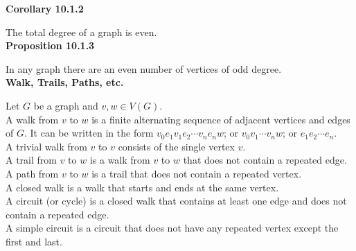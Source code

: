 \documentclass[a4paper]{article}
\newcommand{\subheading}[1]{{\scriptsize\textbf{#1}}}
\begin{document}
\begin{multicols*}{4}
\subheading{Corollary 10.1.2}

The total degree of a graph is even.\\

\subheading{Proposition 10.1.3}

In any graph there are an even number of vertices of odd degree.\\

\subheading{Walk, Trails, Paths, etc.}

Let $G$ be a graph and $v, w \in V(G)$.\\

A walk from $v$ to $w$ is a finite alternating sequence of adjacent vertices and
edges of $G$. It can be written in the form $v_0e_1v_1e_2\cdots v_ne_nw$; or
$v_0v_1\cdots v_nw$; or $e_1e_2\cdots e_n$.\\

A trivial walk from $v$ to $v$ consists of the single vertex $v$.\\

A trail from $v$ to $w$ is a walk from $v$ to $w$ that does not contain a
repeated edge.\\

A path from $v$ to $w$ is a trail that does not contain a repeated vertex.\\

A closed walk is a walk that starts and ends at the same vertex.\\

A circuit (or cycle) is a closed walk that contains at least one edge and does
not contain a repeated edge.\\

A simple circuit is a circuit that does not have any repeated vertex except the
first and last.

\begin{center}
\end{center}


\end{multicols*}
\end{document}
